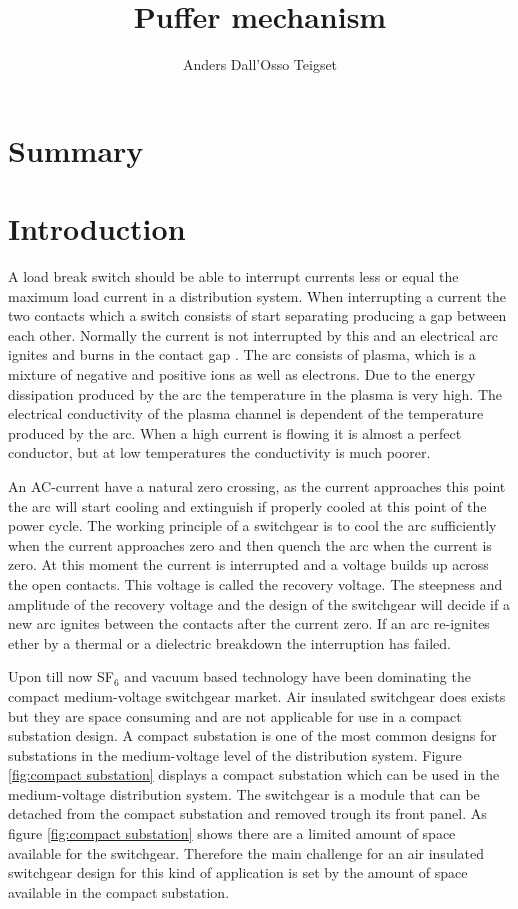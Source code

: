 \documentclass[10pt,a4paper]{article}
\author{Anders Dall'Osso Teigset}
\title{Puffer mechanism}
\begin{document}
\maketitle
\newpage
\section{Summary}
\newpage
\tableofcontents
\newpage
\section{Introduction}
A load break switch should be able to interrupt currents less or equal the maximum load current in a distribution system. When interrupting a current the two contacts which a switch consists of start separating producing a gap between each other. Normally the current is not interrupted by this and an electrical arc ignites and burns in the contact gap \cite{bib:HVEbreak}. The arc consists of plasma, which is a mixture of negative and positive ions as well as electrons. Due to the energy dissipation produced by the arc the temperature in the plasma is very high. The electrical conductivity of the plasma channel is dependent of the temperature produced by the arc. When a high current is flowing it is almost a perfect conductor, but at low temperatures the conductivity is much poorer.

An AC-current have a natural zero crossing, as the current approaches this point the arc will start cooling and extinguish if properly cooled at this point of the power cycle. The working principle of a switchgear is to cool the arc sufficiently when the current approaches zero and then quench the arc when the current is zero. At this moment the current is interrupted and a voltage builds up across the open contacts. This voltage is called the recovery voltage. The steepness and amplitude of the recovery voltage \cite{bib:HVEbreak} and the design of the switchgear will decide if a new arc ignites between the contacts after the current zero. If an arc re-ignites ether by a thermal or a dielectric breakdown the interruption has failed. 

Upon till now SF$_6$ and vacuum based technology have been dominating the compact medium-voltage switchgear market. Air insulated switchgear does exists but they are space consuming and are not applicable for use in a compact substation design. A compact substation is one of the most common designs for substations in the medium-voltage level of the distribution system. Figure \ref{fig:compact substation} displays a compact substation which can be used in the medium-voltage distribution system. The switchgear is a module that can be detached from the compact substation and removed trough its front panel. As figure \ref{fig:compact substation} shows there are a limited amount of space available for the switchgear. Therefore the main challenge for an air insulated switchgear design for this kind of application is set by the amount of space available in the compact substation.
\end{document}
